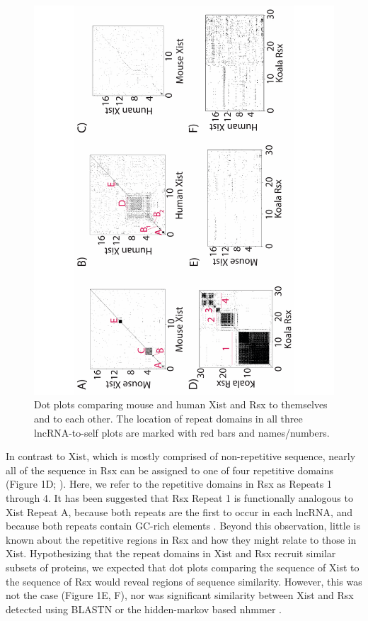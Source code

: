 \begin{figure}[!h]
\centering
\includegraphics[angle=-90, width=\textwidth]{images/fig1-v2-01.pdf}
\caption{Dot plots comparing mouse and human Xist and Rsx to themselves and to each other. The location of repeat domains in all three lncRNA-to-self plots are marked with red bars and names/numbers.}
\end{figure}

In contrast to Xist, which is mostly comprised of non-repetitive sequence, nearly all of the sequence in Rsx can be assigned to one of four repetitive domains (Figure 1D; \cite{Johnson2018AdaptationGenome}). Here, we refer to the repetitive domains in Rsx as Repeats 1 through 4. It has been suggested that Rsx Repeat 1 is functionally analogous to Xist Repeat A, because both repeats are the first to occur in each lncRNA, and because both repeats contain GC-rich elements \cite{Grant2012RsxInactivation,Johnson2018AdaptationGenome}. Beyond this observation, little is known about the repetitive regions in Rsx and how they might relate to those in Xist. Hypothesizing that the repeat domains in Xist and Rsx recruit similar subsets of proteins, we expected that dot plots comparing the sequence of Xist to the sequence of Rsx would reveal regions of sequence similarity. However, this was not the case (Figure 1E, F), nor was significant similarity between Xist and Rsx detected using BLASTN or the hidden-markov based nhmmer \cite{Altschul1990BasicTool,Wheeler2013Nhmmer:HMMs}. 

